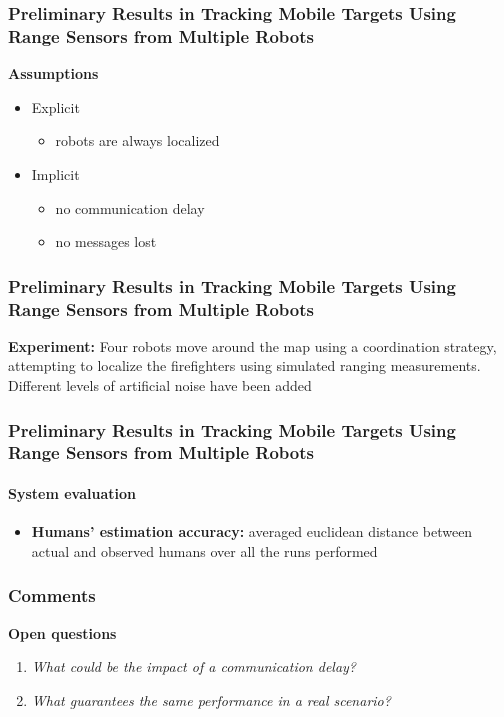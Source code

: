 \begin{frame}
	\frametitle{Preliminary Results in Tracking Mobile Targets Using Range Sensors from Multiple Robots}
	
	\textbf{Assumptions}
	
	\begin{itemize}
		\item Explicit
		
		\begin{itemize}
			\item robots are always localized
		\end{itemize}
		
		\item Implicit
		
		\begin{itemize}
			\item no communication delay
			
			\item no messages lost
		\end{itemize}
	\end{itemize}
\end{frame}

\begin{frame}
	\frametitle{Preliminary Results in Tracking Mobile Targets Using Range Sensors from Multiple Robots}
	
	\textbf{Experiment:} Four robots move around the map using a coordination strategy, attempting to localize the
	firefighters using simulated ranging measurements. Different levels of artificial noise have been added
\end{frame}

\begin{frame}
	\frametitle{Preliminary Results in Tracking Mobile Targets Using Range Sensors from Multiple Robots}
	\framesubtitle{System evaluation}
	
	\begin{itemize}
		\item \textbf{Humans' estimation accuracy:} averaged euclidean distance between actual and observed humans
			  over all the runs performed
	\end{itemize}
\end{frame}

\begin{frame}
	\frametitle{Comments}
	
	\textbf{Open questions}
	
	\begin{enumerate}
		\item \emph{What could be the impact of a communication delay?}
		
		\item \emph{What guarantees the same performance in a real scenario?}
	\end{enumerate}
\end{frame}

